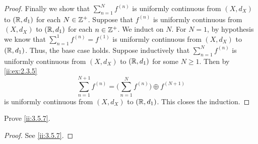 \begin{proof}
  Finally we show that \(\sum_{n = 1}^N f^{(n)}\) is uniformly continuous from \((X, d_X)\) to \((\mathbb{R}, d_1)\) for each \(N \in \mathbb{Z}^+\).
  Suppose that \(f^{(n)}\) is uniformly continuous from \((X, d_X)\) to \((\mathbb{R}, d_1)\) for each \(n \in \mathbb{Z}^+\).
  We induct on \(N\).
  For \(N = 1\), by hypothesis we know that \(\sum_{n = 1}^1 f^{(n)} = f^{(1)}\) is uniformly continuous from \((X, d_X)\) to \((\mathbb{R}, d_1)\).
  Thus, the base case holds.
  Suppose inductively that \(\sum_{n = 1}^N f^{(n)}\) is uniformly continuous from \((X, d_X)\) to \((\mathbb{R}, d_1)\) for some \(N \geq 1\).
  Then by \cref{ii:ex:2.3.5}
  \[
    \sum_{n = 1}^{N + 1} f^{(n)} = \bigg(\sum_{n = 1}^N f^{(n)}\bigg) \oplus f^{(N + 1)}
  \]
  is uniformly continuous from \((X, d_X)\) to \((\mathbb{R}, d_1)\).
  This closes the induction.
\end{proof}

\begin{ex}\label{ii:ex:3.5.2}
  Prove \cref{ii:3.5.7}.
\end{ex}

\begin{proof}
  See \cref{ii:3.5.7}.
\end{proof}
